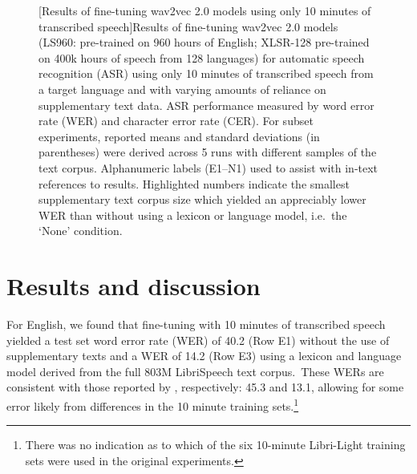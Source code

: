 \documentclass[main.tex]{subfiles}
\begin{document}
\begin{figure}[!t]
{\begin{tabular}{llllll}
\end{tabular}}
[Results of fine-tuning wav2vec 2.0 models using only 10 minutes of transcribed speech]{Results of fine-tuning wav2vec 2.0 models (LS960: pre-trained on 960 hours of English; XLSR-128 pre-trained on 400k hours of speech from 128 languages) for  automatic speech recognition (ASR) using only 10 minutes of transcribed speech from a target language and with varying amounts of reliance on supplementary text data. ASR performance measured by word error rate (WER) and character error rate (CER). For subset experiments, reported means and standard deviations (in parentheses) were derived across 5 runs with different samples of the text corpus.
Alphanumeric labels (E1--N1) used to assist with in-text references to results. Highlighted numbers indicate the smallest supplementary text corpus size which yielded an appreciably lower WER than without using a lexicon or language model, i.e.~the `None' condition.}
\label{tab:results}
\end{figure}

\section{Results and discussion}
\label{sec:resdisc}


For English, we found that fine-tuning with 10 minutes of transcribed speech yielded a test set word error rate (WER) of 40.2 (Row E1) without the use of supplementary texts and a WER of 14.2 (Row E3) using a lexicon and language model derived from the full 803M LibriSpeech text corpus.~These WERs are consistent with those reported by \textcite[][Table 9]{NEURIPS2020_92d1e1eb}, respectively: 45.3 and 13.1, allowing for some error likely from differences in the 10 minute training sets.\footnote{There was no indication as to which of the six 10-minute Libri-Light training sets were used in the original experiments.}
\end{document}
